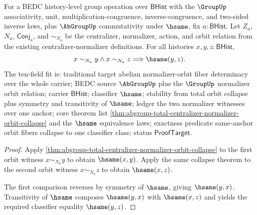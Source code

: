 \begin{theorem}
\label{thm:abgroup-centralizer-normalizer-orbit-total-fiber-determinacy}
For a BEDC history-level group operation over $\mathsf{BHist}$ with the
$\GroupUp$ associativity, unit, multiplication-congruence, inverse-congruence,
and two-sided inverse laws, plus $\AbGroupUp$ commutativity under $\hsame$, fix
$a:\mathsf{BHist}$. Let $Z_a$, $N_a$, $\mathsf{Conj}_s$, and $\sim_{N_a}$ be
the centralizer, normalizer, action, and orbit relation from the existing
centralizer-normalizer definitions. For all histories $x,y,z:\mathsf{BHist}$,
$$
x\sim_{N_a}y\land x\sim_{N_a}z \Longrightarrow \hsame(y,z).
$$
The ten-field fit is: traditional target abelian normalizer-orbit fiber
determinacy over the whole carrier; BEDC source $\AbGroupUp$ plus the
$\GroupUp$ normalizer orbit relation; carrier $\mathsf{BHist}$; classifier
$\hsame$; stability from total orbit collapse plus symmetry and transitivity
of $\hsame$; ledger the two normalizer witnesses over one anchor; core theorem
list \autoref{thm:abgroup-total-centralizer-normalizer-orbit-collapse} and the
$\hsame$ equivalence laws; exactness predicate same-anchor orbit fibers
collapse to one classifier class; status $\mathsf{ProofTarget}$.
\end{theorem}
\begin{proof}
Apply \autoref{thm:abgroup-total-centralizer-normalizer-orbit-collapse} to the
first orbit witness $x\sim_{N_a}y$ to obtain $\hsame(x,y)$. Apply the same
collapse theorem to the second orbit witness $x\sim_{N_a}z$ to obtain
$\hsame(x,z)$.

The first comparison reverses by symmetry of $\hsame$, giving $\hsame(y,x)$.
Transitivity of $\hsame$ composes $\hsame(y,x)$ with $\hsame(x,z)$ and yields
the required classifier equality $\hsame(y,z)$.
\end{proof}

